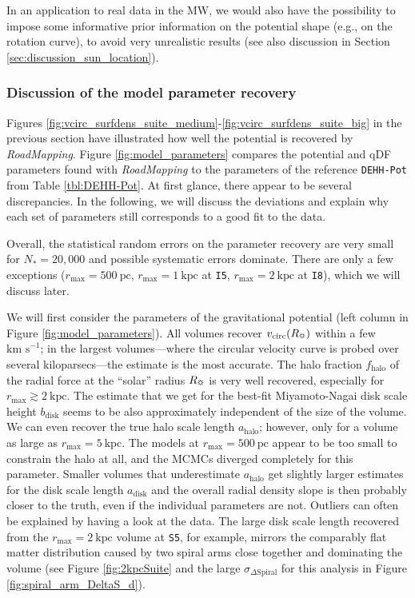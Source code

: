 \documentclass[iop,revtex4,numberedappendix,appendixfloats]{emulateapj}
\newcommand{\RM}{{\sl RoadMapping}}
\begin{document}
In an application to real data in the MW, we would also have the possibility to impose some informative prior information on the potential shape (e.g., on the rotation curve), to avoid very unrealistic results (see also discussion in Section \ref{sec:discussion_sun_location}).

\subsubsection{Discussion of the model parameter recovery} \label{sec:parameter recovery}

Figures \ref{fig:vcirc_surfdens_suite_medium}-\ref{fig:vcirc_surfdens_suite_big} in the previous section have illustrated how well the potential is recovered by \RM{}. Figure \ref{fig:model_parameters} compares the potential and qDF parameters found with \RM{} to the parameters of the reference \texttt{DEHH-Pot} from Table \ref{tbl:DEHH-Pot}. At first glance, there appear to be several discrepancies. In the following, we will discuss the deviations and explain why each set of parameters still corresponds to a good fit to the data.

Overall, the statistical random errors on the parameter recovery are very small for $N_*=20,000$ and possible systematic errors dominate. There are only a few exceptions ($r_\text{max}=500~\text{pc}$, $r_\text{max}=1~\text{kpc}$ at \texttt{I5}, $r_\text{max}=2~\text{kpc}$ at \texttt{I8}), which we will discuss later.

We will first consider the parameters of the gravitational potential (left column in Figure \ref{fig:model_parameters}). All volumes recover $v_\text{circ}(R_\text{\sun})$ within a few $\text{km s}^{-1}$; in the largest volumes---where the circular velocity curve is probed over several kiloparsecs---the estimate is the most accurate. The halo fraction $f_\text{halo}$ of the radial force at the ``solar'' radius $R_\text{\sun}$ is very well recovered, especially for $r_\text{max}\gtrsim 2~\text{kpc}$. The estimate that we get for the best-fit Miyamoto-Nagai disk scale height $b_\text{disk}$ seems to be also approximately independent of the size of the volume. We can even recover the true halo scale length $a_\text{halo}$; however, only for a volume as large as $r_\text{max}=5~\text{kpc}$. The models at $r_\text{max}=500~\text{pc}$ appear to be too small to constrain the halo at all, and the MCMCs diverged completely for this parameter. Smaller volumes that underestimate $a_\text{halo}$ get slightly larger estimates for the disk scale length $a_\text{disk}$ and the overall radial density slope is then probably closer to the truth, even if the individual parameters are not. Outliers can often be explained by having a look at the data. The large disk scale length recovered from the $r_\text{max}=2~\text{kpc}$ volume at \texttt{S5}, for example, mirrors the comparably flat matter distribution caused by two spiral arms close together and dominating the volume (see Figure \ref{fig:2kpcSuite} and the large $\sigma_{\Delta\text{Spiral}}$ for this analysis in Figure \ref{fig:spiral_arm_DeltaS_d}). 
\end{document}
